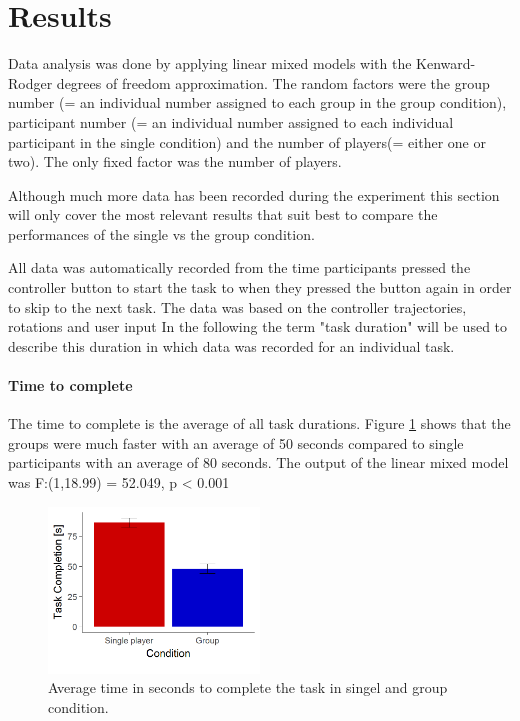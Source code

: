 \documentclass{article}
\begin{document}


\section{Results}
Data analysis was done by applying linear mixed models with the Kenward-Rodger degrees of freedom approximation. The random factors were the group number (= an individual number assigned to each group in the group condition), participant number (= an individual number assigned to each individual participant in the single condition) and the number of players(= either one or two). The only fixed factor was the number of players. 

 Although much more data has been recorded during the experiment this section will only cover the most relevant results that suit best to compare the performances of the single vs the group condition. 
 
 All data was automatically recorded from the time participants pressed the controller button to start the task to when they pressed the button again in order to skip to the next task. The data was based on the controller trajectories, rotations and user input  In the following the term "task duration" will be used to describe this duration in which data was recorded for an individual task.

\paragraph{Time to complete}
The time to complete is the average of all task durations.  Figure \ref{fig:results_duration} shows that the groups were much faster with an average of 50 seconds compared to single participants with an average of 80 seconds. The output of the linear mixed model was F:(1,18.99) = 52.049, p < 0.001 

\begin{figure}[h]
\centering
\includegraphics[width=0.5\textwidth]{results_duration}
\caption{Average time in seconds to complete the task in singel and group condition.} \label{fig:results_duration}
\end{figure}
\end{document}
